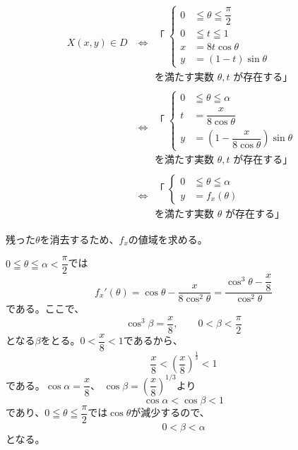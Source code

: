 \[
\begin{aligned}
X(x,y)\in D
&\Longleftrightarrow
\begin{gathered}
\text{「}\;
\left\{
\begin{aligned}
0&\leqq\theta\leqq\dfrac{\pi}{2}\\
0&\leqq t\leqq1\\
x&=8t\cos\theta\\
y&=(1-t)\sin\theta
\end{aligned}
\right.\\
\text{を満たす実数 }\theta,t\text{ が存在する」}
\end{gathered}\\
&\Longleftrightarrow
\begin{gathered}
\text{「}\;
\left\{
\begin{aligned}
0&\leqq\theta\leqq\alpha\\
t&=\dfrac{x}{8\cos\theta}\\
y&=\left(1-\dfrac{x}{8\cos\theta}\right)\sin\theta
\end{aligned}
\right.\\
\text{を満たす実数 }\theta,t\text{ が存在する」}
\end{gathered}\\
&\Longleftrightarrow
\begin{gathered}
\text{「}\;
\left\{
\begin{aligned}
0&\leqq\theta\leqq\alpha\\
y&=f_x(\theta)
\end{aligned}
\right.\\
\text{を満たす実数 }\theta\text{ が存在する」}
\end{gathered}
\end{aligned}
\]

残った$\theta$を消去するため、$f_x$の値域を求める。

$0\leqq\theta\leqq\alpha<\dfrac{\pi}{2}$では
\[
f_x'(\theta)
=\cos\theta-\dfrac{x}{8\cos^2\theta}
=\dfrac{\cos^3\theta-\dfrac{x}{8}}{\cos^2\theta}
\]
である。ここで、
\[
\cos^3\beta=\dfrac{x}{8},
\qquad
0<\beta<\dfrac{\pi}{2}
\]
となる$\beta$をとる。$0<\dfrac{x}{8}<1$であるから、
\[
\dfrac{x}{8}<\left(\dfrac{x}{8}\right)^{\frac{1}{3}}<1
\]
である。$\cos\alpha=\dfrac{x}{8}$、
$\cos\beta=\left(\dfrac{x}{8}\right)^{1/3}$より
\[
\cos\alpha<\cos\beta<1
\]
であり、$0\leqq\theta\leqq\dfrac{\pi}{2}$では$\cos\theta$が減少するので、
\[
0<\beta<\alpha
\]
となる。

